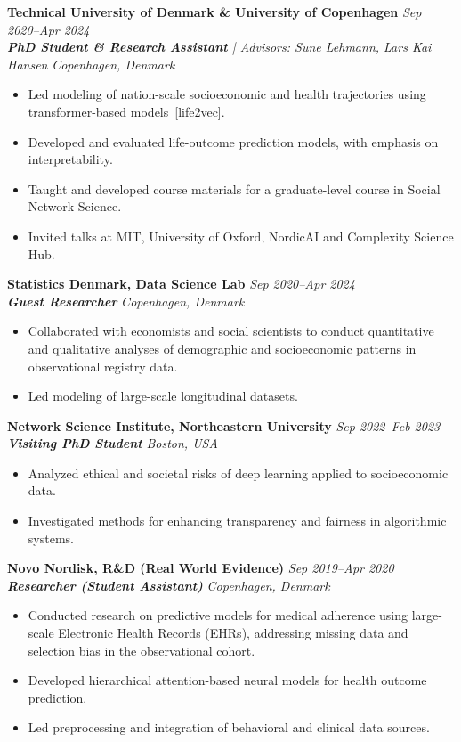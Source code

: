 \documentclass[10.5pt]{article}
\newcommand{\entry}[4]{%
  \noindent\textbf{#1} \hfill \textit{\small #3}\\
  \textit{#2} \hfill \textit{\small #4}\par
}
\begin{document}
\entry{Technical University of Denmark \& University of Copenhagen}{\textbf{PhD Student \& Research Assistant} | Advisors: Sune Lehmann, Lars Kai Hansen}{Sep 2020--Apr 2024}{Copenhagen, Denmark}
\begin{itemize}
  \item Led modeling of nation-scale socioeconomic and health trajectories using transformer-based models~\href{https://life2vec.dk}{[life2vec]}.
  \item Developed and evaluated life-outcome prediction models, with emphasis on interpretability.
  \item Taught and developed course materials for a graduate-level course in Social Network Science.
  \item Invited talks at MIT, University of Oxford, NordicAI and Complexity Science Hub.
\end{itemize}

\entry{Statistics Denmark, Data Science Lab}{\textbf{Guest Researcher}}{Sep 2020--Apr 2024}{Copenhagen, Denmark}
\begin{itemize}
  \item Collaborated with economists and social scientists to conduct quantitative and qualitative analyses of demographic and socioeconomic patterns in observational registry data.
  \item Led modeling of large-scale longitudinal datasets.
\end{itemize}

\entry{Network Science Institute, Northeastern University}{\textbf{Visiting PhD Student}}{Sep 2022--Feb 2023}{Boston, USA}
\begin{itemize}
  \item Analyzed ethical and societal risks of deep learning applied to socioeconomic data.
  \item Investigated methods for enhancing transparency and fairness in algorithmic systems.
\end{itemize}

\entry{Novo Nordisk, R\&D (Real World Evidence)}{\textbf{Researcher (Student Assistant)}}{Sep 2019--Apr 2020}{Copenhagen, Denmark}
\begin{itemize}
  \item Conducted research on predictive models for medical adherence using large-scale Electronic Health Records (EHRs), addressing missing data and selection bias in the observational cohort.
  \item Developed hierarchical attention-based neural models for health outcome prediction.
  \item Led preprocessing and integration of behavioral and clinical data sources.
\end{itemize}
\end{document}
